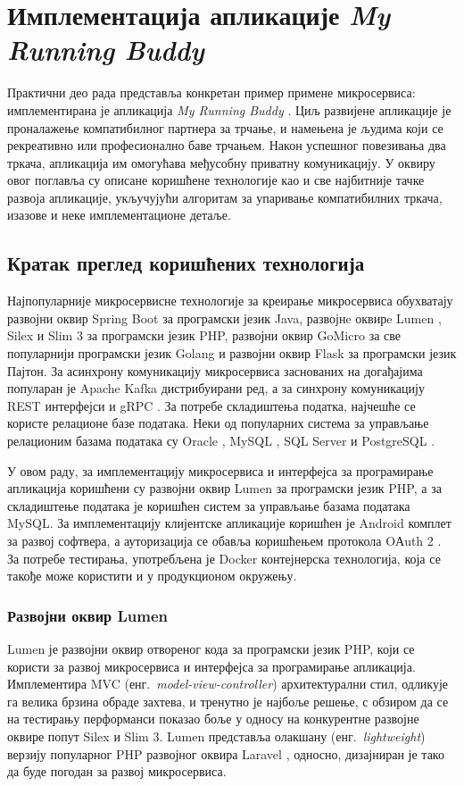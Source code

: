 \documentclass[12pt,oneside]{memoir}
\begin{document}
\chapter{Имплементација апликације \textit{My Running Buddy}}\label{prakticnideo}
Практични део рада представља конкретан пример примене микросервиса: имплементирана је апликација \textit{My Running Buddy} \cite{implementacija}. Циљ развијене апликације је проналажење компатибилног партнера за трчање, и намењена је људима који се рекреативно или професионално баве трчањем. Након успешног повезивања два тркача, апликација им омогућава међусобну приватну комуникацију. У оквиру овог поглавља су описане коришћене технологије као и све најбитније тачке развоја апликације, укључујући алгоритам за упаривање компатибилних тркача, изазове и неке имплементационе детаље.

\section{Кратак преглед коришћених технологија}
Најпопуларније микросервисне технологије за креирање микросервиса обухватају развојни оквир Spring Boot \cite{SpringBoot} за програмски језик Java, развојнe оквирe Lumen \cite{Lumen}, Silex \cite{Silex} и Slim 3 \cite{Slim3} за програмски језик PHP, развојни оквир GoMicro \cite{GoMicro} за све популарнији програмски језик Golang и развојни оквир Flask \cite{Flask} за програмски језик Пајтон. За асинхрону комуникацију микросервиса заснованих на догађајима популаран је Apache Kafka \cite{Kafka} дистрибуирани ред, а за синхрону комуникацију REST интерфејси и gRPC \cite{gRPC}. За потребе складиштења податка, најчешће се користе релационе базе података. Неки од популарних система за управљање релационим базама података су Oracle \cite{oracle}, MySQL \cite{mysql}, SQL Server \cite{sqlserver} и PostgreSQL \cite{postgresql}.

У овом раду, за имплементацију микросервиса и интерфејса за програмирање апликација коришћени су развојни оквир Lumen за програмски језик PHP, а за складиштење података је коришћен систем за управљање базама података MySQL. За имплементацију клијентске апликације коришћен је Android комплет за развој софтвера, а ауторизација се обавља коришћењем протокола OАuth 2 \cite{MasteringOAuth2}. За потребе тестирања, употребљена је Docker контејнерска технологија, која се такође може користити и у продукционом окружењу.

\subsection{Развојни оквир Lumen}
Lumen је развојни оквир отвореног кода за програмски језик PHP, који се користи за развој микросервиса и интерфејса за програмирање апликација. Имплементира MVC (енг.~\textit{model-view-controller}) архитектурални стил, одликује га велика брзина обраде захтева, и тренутно је најбоље решење, с обзиром да се на тестирању перформанси показао боље у односу на конкурентне развојне оквире попут Silex и Slim 3. Lumen представља олакшану (енг.~\textit{lightweight}) верзију популарног PHP развојног оквира Laravel \cite{Laravel}, односно, дизајниран је тако да буде погодан за развој микросервиса.
\end{document}
